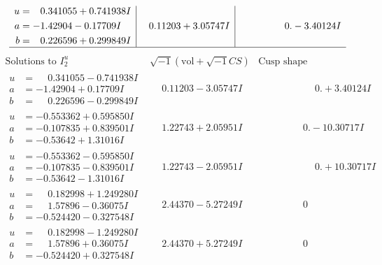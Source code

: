 \documentclass[1p]{elsarticle_modified}
\theoremstyle{definition}
\newcommand{\I}{\sqrt{-1}}
\begin{document}
$$\begin{array}{c|c|c}
\begin{aligned}
u &= \phantom{-}0.341055 + 0.741938 I \\
a &= -1.42904 - 0.17709 I \\
b &= \phantom{-}0.226596 + 0.299849 I\end{aligned}
 & \phantom{-}0.11203 + 3.05747 I & \phantom{-0.000000 } 0. - 3.40124 I\\
 \hline 
 \end{array}$$\newpage$$\begin{array}{c|c|c}  
\text{Solutions to }I^u_{2}& \I (\text{vol} + \sqrt{-1}CS) & \text{Cusp shape}\\
 \hline 
\begin{aligned}
u &= \phantom{-}0.341055 - 0.741938 I \\
a &= -1.42904 + 0.17709 I \\
b &= \phantom{-}0.226596 - 0.299849 I\end{aligned}
 & \phantom{-}0.11203 - 3.05747 I & \phantom{-0.000000 -}0. + 3.40124 I \\ \hline\begin{aligned}
u &= -0.553362 + 0.595850 I \\
a &= -0.107835 + 0.839501 I \\
b &= -0.53642 + 1.31016 I\end{aligned}
 & \phantom{-}1.22743 + 2.05951 I & \phantom{-0.000000 } 0. - 10.30717 I \\ \hline\begin{aligned}
u &= -0.553362 - 0.595850 I \\
a &= -0.107835 - 0.839501 I \\
b &= -0.53642 - 1.31016 I\end{aligned}
 & \phantom{-}1.22743 - 2.05951 I & \phantom{-0.000000 -}0. + 10.30717 I \\ \hline\begin{aligned}
u &= \phantom{-}0.182998 + 1.249280 I \\
a &= \phantom{-}1.57896 - 0.36075 I \\
b &= -0.524420 - 0.327548 I\end{aligned}
 & \phantom{-}2.44370 - 5.27249 I & \phantom{-0.000000 } 0 \\ \hline\begin{aligned}
u &= \phantom{-}0.182998 - 1.249280 I \\
a &= \phantom{-}1.57896 + 0.36075 I \\
b &= -0.524420 + 0.327548 I\end{aligned}
 & \phantom{-}2.44370 + 5.27249 I & \phantom{-0.000000 } 0 \\ \hline\begin{aligned}

\end{aligned}
\end{array}$$
\end{document}
